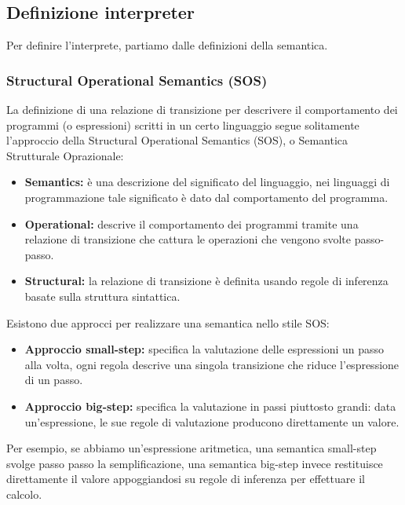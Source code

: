 \documentclass[12pt,a4paper]{article}
\begin{document}
\subsection{Definizione interpreter}
Per definire l'interprete, partiamo dalle definizioni della semantica.
\subsubsection{Structural Operational Semantics (SOS)}
La definizione di una relazione di transizione per descrivere il comportamento dei programmi (o espressioni) scritti in un certo linguaggio segue solitamente l'approccio della Structural Operational Semantics (SOS), o Semantica Strutturale Oprazionale:
\begin{itemize}
  \item \textbf{Semantics:} è una descrizione del significato del linguaggio, nei linguaggi di programmazione tale significato è dato dal comportamento del programma.
  \item \textbf{Operational:} descrive il comportamento dei programmi tramite una relazione di transizione che cattura le operazioni che vengono svolte passo-passo.
  \item \textbf{Structural:} la relazione di transizione è definita usando regole di inferenza basate sulla struttura sintattica.
\end{itemize}
Esistono due approcci per realizzare una semantica nello stile SOS:
\begin{itemize}
  \item \textbf{Approccio small-step:} specifica la valutazione delle espressioni un passo alla volta, ogni regola descrive una singola transizione che riduce l'espressione di un passo.
  \item \textbf{Approccio big-step:} specifica la valutazione in passi piuttosto grandi: data un'espressione, le sue regole di valutazione producono direttamente un valore.
\end{itemize}
Per esempio, se abbiamo un'espressione aritmetica, una semantica small-step svolge passo passo la semplificazione, una semantica big-step invece restituisce direttamente il valore appoggiandosi su regole di inferenza per effettuare il calcolo.\\
\end{document}
